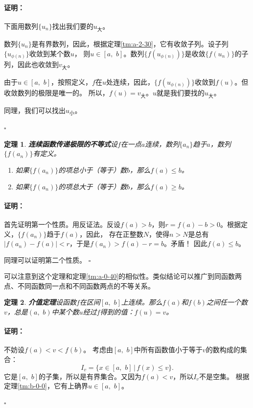 \documentclass[12pt,UTF8]{ctexbook}
\newtheorem{tm}{定理}[section]
\renewenvironment{proof}{\paragraph{\textbf{证明：}}}{\hfill$\square$}
\begin{document}
\begin{appendix}
\begin{proof}
    下面用数列$\{u_n\}$找出我们要的$u_{\text{大}}$。

    数列$\{u_n\}$是有界数列，因此，根据定理\ref{tm:a-2-30}，它有收敛子列。设子列$\{u_{\phi(n)}\}$收敛到某个数$u$，
    则$u\in[a,\,\,b]$。数列$\{f(u_{\phi(n)})\}$是收敛$\{f(u_n)\}$的子列，因此也收敛到$v_{\text{大}}$。

    由于$u\in[a,\,\,b]$，按照定义，$f$在$u$处连续，因此，$\{f(u_{\phi(n)})\}$收敛到$f(u)$。但收敛数列的极限是唯一的。
    所以，$f(u) = v_{\text{大}}$。$u$就是我们要找的$u_{\text{大}}$。

    同理，我们可以找出$u_{\text{小}}$。

\end{proof}

\begin{tm}{\textbf{连续函数传递极限的不等式}}\label{tm:b-1-10}
    设$f$在一点$a$连续，数列$\{a_n\}$趋于$a$，数列$\{f(a_n)\}$有定义。
    \begin{enumerate}
        \item 如果$\{f(a_n)\}$的项总小于（等于）数$b$，那么$f(a)\leqslant b$。
        \item 如果$\{f(a_n)\}$的项总大于（等于）数$b$，那么$f(a)\geqslant b$。
    \end{enumerate}
\end{tm}
\begin{proof}
    首先证明第一个性质。用反证法。反设$f(a) > b$，则$r = f(a) - b > 0$。根据定义，$\{f(a_n)\}$趋于$f(a)$，因此，
    存在正整数$N$，使得$n>N$是总有$|f(a_n) - f(a)| < r$，于是$f(a_n) > f(a) - r = b$。矛盾！
    因此$f(a)\leqslant b$。

    同理可以证明第二个性质。
\end{proof}

可以注意到这个定理和定理\ref{tm:a-0-40}的相似性。类似结论可以推广到同函数两点、不同函数同一点和不同函数两点的不等关系。

\begin{tm}{\textbf{介值定理}}\label{tm:b-1-20}
    设函数$f$在区间$[a, \,\,b]$上连续。那么$f(a)$和$f(b)$之间任一个数$v$，总是$(a, \,\,b)$中某个数$u$经过$f$得到的值：$f(u) = v$。
\end{tm}
\begin{proof}
    不妨设$f(a) < v < f(b)$。
    考虑由$[a, \,\,b]$中所有函数值小于等于$v$的数构成的集合：
    $$I_v = \{ x \in [a, \,\,b] \, | \, f(x) \leqslant v\}.$$
    它是$[a, \,\,b]$的子集，所以是有界集合。又因为$f(a) < v$，所以$I_v$不是空集。
    根据定理\ref{tm:b-0-0}，它有上确界$u\in[a,\,\,b]$。


\end{proof}
\end{appendix}
\end{document}
